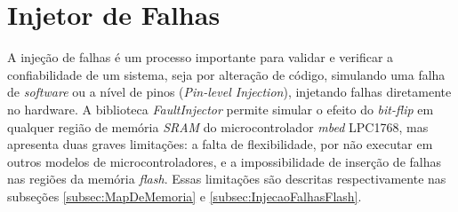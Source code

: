 



\section{Injetor de Falhas} \label{sec:InjetorDeFalhas}

A injeção de falhas é um processo importante para validar e verificar a confiabilidade de um sistema, seja por alteração de código, simulando uma falha de \textit{software} ou a nível de pinos (\textit{Pin-level Injection}), injetando falhas diretamente no hardware. A biblioteca \textit{FaultInjector} permite simular o efeito do \textit{bit-flip} em qualquer região de memória \textit{SRAM} do microcontrolador \textit{mbed} LPC1768, mas apresenta duas graves limitações: a falta de flexibilidade, por não executar em outros modelos de microcontroladores, e a impossibilidade de inserção de falhas nas regiões da memória \textit{flash}. Essas limitações são descritas respectivamente nas subseções \ref{subsec:MapDeMemoria} e \ref{subsec:InjecaoFalhasFlash}.

